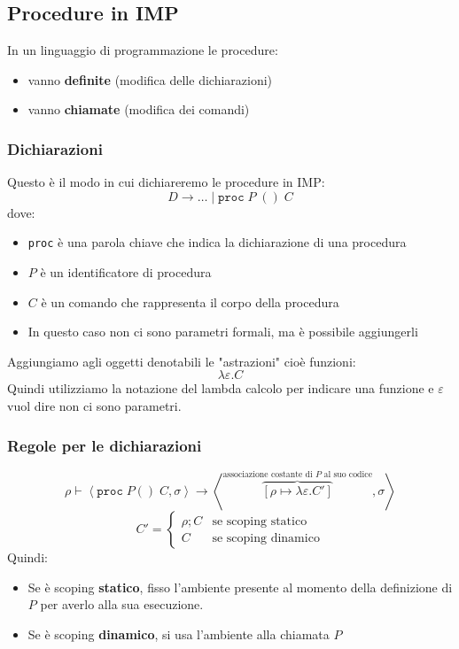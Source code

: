 \documentclass[a4paper]{article}
\begin{document}
\subsection{Procedure in IMP}

In un linguaggio di programmazione le procedure:
\begin{itemize}
  \item vanno \textbf{definite} (modifica delle dichiarazioni)
  \item vanno \textbf{chiamate} (modifica dei comandi)
\end{itemize}

\subsubsection*{Dichiarazioni}
Questo è il modo in cui dichiareremo le procedure in IMP:
\[
  D \to \dots \; | \; \texttt{proc} \; P \; () \;  C
\]
dove:
\begin{itemize}
  \item \texttt{proc} è una parola chiave che indica la dichiarazione di una procedura
  \item $P$ è un identificatore di procedura
  \item $C$ è un comando che rappresenta il corpo della procedura
  \item In questo caso non ci sono parametri formali, ma è possibile aggiungerli
\end{itemize}
Aggiungiamo agli oggetti denotabili le "astrazioni" 
cioè funzioni:
\[
  \lambda \varepsilon. C
\]
Quindi utilizziamo la notazione del lambda calcolo per indicare una funzione e 
$\varepsilon$ vuol dire non ci sono parametri.
\subsubsection{Regole per le dichiarazioni}
\[
  \rho \vdash \left<\texttt{proc} \; P() \; C, \sigma\right> \rightarrow \left<\overbrace{[\rho \mapsto \lambda\varepsilon. C']}^{\text{associazione costante di $P$ al suo codice}}, \sigma\right>
\]
\[
C' = 
\begin{cases}
  \rho ; C & \text{se scoping statico}\\
  C & \text{se scoping dinamico}
\end{cases}
\]
Quindi:
\begin{itemize}
  \item Se è scoping \textbf{statico}, fisso l'ambiente presente al momento della definizione di $P$ per averlo alla sua esecuzione.
  \item Se è scoping \textbf{dinamico}, si usa l'ambiente alla chiamata $P$
\end{itemize}
\end{document}

